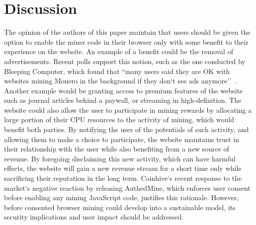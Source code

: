 \section{Discussion}
The opinion of the authors of this paper maintain that users should be given the option to enable the miner code in their browser only with some benefit to their experience on the website.  An example of a benefit could be the removal of advertisements. Recent polls support this notion, such as the one conducted by Bleeping Computer, which found that ``many users said they are OK with websites mining Monero in the background if they don`t see ads anymore''~\cite{bleepingcomputerminers}. Another example would be granting access to premium features of the website such as journal articles behind a paywall, or streaming in high-definition. The website could also allow the user to participate in mining rewards by allocating a large portion of their CPU resources to the activity of mining, which would benefit both parties. By notifying the user of the potentials of such activity, and allowing them to make a choice to participate, the website maintains trust in their relationship with the user while also benefiting from a new source of revenue. By foregoing disclaiming this new activity, which can have harmful effects, the website will gain a new revenue stream for a short time only while sacrificing their reputation in the long term. Coinhive`s recent response to the market`s negative reaction by releasing AuthedMine, which enforces user consent before enabling any mining JavaScript code, justifies this rationale. However, before consented browser mining could develop into a sustainable model, its security implications and user impact should be addressed.

